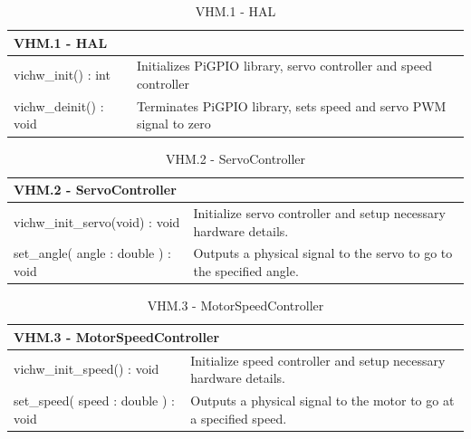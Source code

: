 \documentclass [10pt]{article}
\begin{document}
\newcommand{\VCMSPEEDsig}{get\_speed( ) : double}
\newcommand{\VCMSPEEDdesc}{Returns the current speed of the vehicle as measured by the Hall Effect sensor.}

\newcommand{\VCMSERVOsig}{set\_angle( angle : double ) : void}
\newcommand{\VCMSERVOdesc}{Outputs a physical signal to the servo to go to the specified angle.}

\newcommand{\VCMMOTORsig}{set\_speed( speed : double ) : void}
\newcommand{\VCMMOTORdesc}{Outputs a physical signal to the motor to go at a specified speed.}

\begin{longtable}{| p{ } | p{ } | }\caption{VHM.1 - HAL} \\\hline  
\multicolumn{2}{|l|}{\textbf {VHM.1 - HAL}}\\ \hline
 \rowcolor{tableCell}   vichw\_init() : int & Initializes PiGPIO library, servo controller and speed controller \\\hline
 vichw\_deinit() : void &  Terminates PiGPIO library, sets speed and servo PWM signal to zero \\ \hline
\end{longtable}

\begin{longtable}{| p{ } | p{ } | }\caption{VHM.2 - ServoController} \\\hline  
\multicolumn{2}{|l|}{\textbf {VHM.2 - ServoController}}\\ \hline
vichw\_init\_servo(void) : void & Initialize servo controller and setup necessary hardware details. \\ \hline
 \rowcolor{tableCell} \VCMSERVOsig & \VCMSERVOdesc \\\hline
\end{longtable}

\begin{longtable}{| p{ } | p{ } | }\caption{VHM.3 - MotorSpeedController} \\\hline  
\multicolumn{2}{|l|}{\textbf {VHM.3 - MotorSpeedController}}\\ \hline
 vichw\_init\_speed() : void & Initialize speed controller and setup necessary hardware details. \\ \hline
 \rowcolor{tableCell} \VCMMOTORsig & \VCMMOTORdesc \\\hline
\end{longtable}
\end{document}
